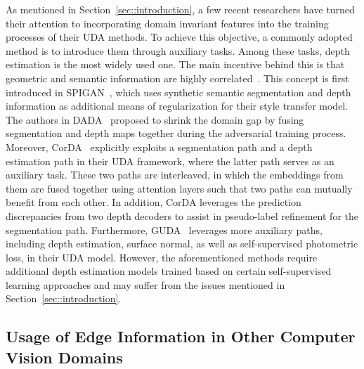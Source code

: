 \documentclass{bmvc2k}
\begin{document}
As mentioned in Section~\ref{sec::introduction}, a few recent researchers have turned their attention to incorporating domain invariant features into the training processes of their UDA methods. To achieve this objective, a commonly adopted method is to introduce them through 
auxiliary tasks. Among these tasks, depth estimation is the most widely used one. The main incentive behind this is that geometric and semantic information are highly correlated~\cite{Chen_2019_GIOada, Lee2019SPIGANPA, vu2019dada, Saha_2021_CVPR_CTRL, wang2021domain, guizilini2021geometric}. This concept is first introduced in SPIGAN~\cite{Lee2019SPIGANPA}, which uses synthetic semantic segmentation and depth information as additional means of regularization for their style transfer model. The authors in DADA~\cite{vu2019dada} proposed to shrink the domain gap by fusing segmentation and depth maps together during the adversarial training process. Moreover, CorDA~\cite{wang2021domain} explicitly exploits a segmentation path and a depth estimation path in their UDA framework, where the latter path serves as an auxiliary task. These two paths are interleaved, in which the embeddings from them are fused together using attention layers such that two paths can mutually benefit from each other. In addition, CorDA leverages the prediction discrepancies from two depth decoders to assist in pseudo-label refinement for the segmentation path. Furthermore, GUDA~\cite{guizilini2021geometric} leverages more auxiliary paths, including depth estimation, surface normal, as well as self-supervised photometric loss, in their UDA model. However, the aforementioned methods require additional depth estimation models trained based on certain self-supervised learning approaches and may suffer from the issues mentioned in Section~\ref{sec::introduction}.






\subsection{Usage of Edge Information in Other Computer Vision Domains}
\label{subsec::edge_infor_in_aux_task}
\end{document}
